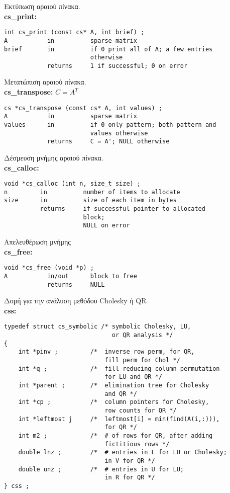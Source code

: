 Εκτύπωση αραιού πίνακα.\\
\textbf{cs\_print:}
\begin{verbatim}
int cs_print (const cs* A, int brief) ;
A           in          sparse matrix
brief       in          if 0 print all of A; a few entries 
                        otherwise
            returns     1 if successful; 0 on error
\end{verbatim}

Μετατώπιση αραιού πίνακα.\\
\textbf{cs\_transpose:} $C = A^T$
\begin{verbatim}
cs *cs_transpose (const cs* A, int values) ;
A           in          sparse matrix
values      in          if 0 only pattern; both pattern and 
                        values otherwise
            returns     C = A'; NULL otherwise
\end{verbatim}


Δέσμευση μνήμης αραιού πίνακα.\\
\textbf{cs\_calloc:}
\begin{verbatim}
void *cs_calloc (int n, size_t size) ;
n         in          number of items to allocate
size      in          size of each item in bytes
          returns     if successful pointer to allocated 
                      block; 
                      NULL on error
\end{verbatim}

Απελευθέρωση μνήμης\\
\textbf{cs\_free:}
\begin{verbatim}
void *cs_free (void *p) ;
A           in/out      block to free
            returns     NULL
\end{verbatim}

Δομή για την ανάλυση μεθόδου  Cholesky ή  QR \\
\textbf{css:}
\begin{verbatim}
typedef struct cs_symbolic /* symbolic Cholesky, LU, 
                              or QR analysis */
{
    int *pinv ;         /*  inverse row perm, for QR, 
                            fill perm for Chol */
    int *q ;            /*  fill-reducing column permutation 
                            for LU and QR */
    int *parent ;       /*  elimination tree for Cholesky 
                            and QR */
    int *cp ;           /*  column pointers for Cholesky, 
                            row counts for QR */
    int *leftmost j     /*  leftmost[i] = min(find(A(i,:))), 
                            for QR */
    int m2 ;            /*  # of rows for QR, after adding 
                            fictitious rows */
    double lnz ;        /*  # entries in L for LU or Cholesky; 
                            in V for QR */
    double unz ;        /*  # entries in U for LU; 
                            in R for QR */
} css ;
\end{verbatim}

